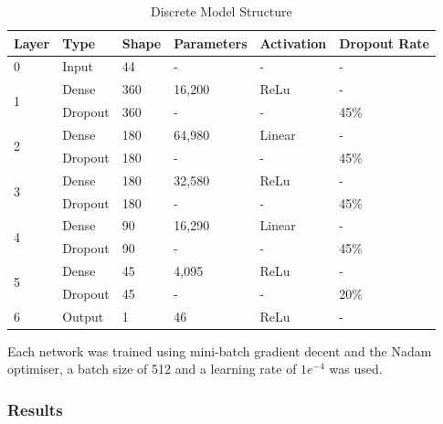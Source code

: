 \begin{table}[!h]
    \centering
    \caption{Discrete Model Structure}
    \begin{tabular}[b]{l l l l l l }
        \textbf{Layer} & \textbf{Type} & \textbf{Shape} & \textbf{Parameters} & \textbf{Activation} & \textbf{Dropout Rate} \\
        \hline
        0 & Input & 44 & - & - & - \\
        \hline
        \multirow[t]{2}{*}{1} & Dense & 360 & 16,200 & ReLu  & - \\ \cline{2-6}
        
                & Dropout & 360 & - & - & 45\% \\
        \hline
        \multirow[t]{2}{*}{2} & Dense & 180 & 64,980 & Linear  & - \\ \cline{2-6}
        
        & Dropout & 180 & - & - & 45\% \\
        \hline
        \multirow[t]{2}{*}{3} & Dense & 180 & 32,580 & ReLu  & - \\ \cline{2-6}
        
        & Dropout & 180 & - & - & 45\% \\
        \hline
        \multirow[t]{2}{*}{4} & Dense & 90 & 16,290 & Linear  & - \\ \cline{2-6}
        
        & Dropout & 90 & - & - & 45\% \\
        \hline
        \multirow[t]{2}{*}{5} & Dense & 45 & 4,095 & ReLu  & - \\ \cline{2-6}
        
        & Dropout & 45 & - & - & 20\% \\
        \hline
        6 & Output & 1 & 46 & ReLu & - \\
        \hline
    \end{tabular}
    \label{tab:discrete_model_struct}
\end{table}

Each network was trained using mini-batch gradient decent and the Nadam optimiser, a batch size of 512 and a learning rate of $1e^{-4}$ was used.


\FloatBarrier
\subsubsection{Results}


